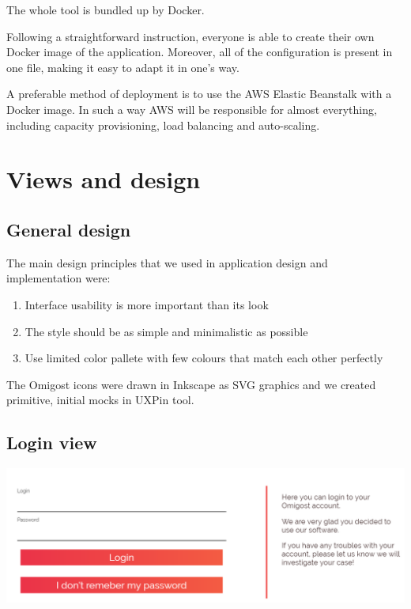 \documentclass[licencjacka,en]{thesisclass}
\begin{document}
    The whole tool is bundled up by Docker.

    Following a straightforward instruction, everyone is able
    to create their own Docker image of the application.
    Moreover, all of the configuration is present in one file,
    making it easy to adapt it in one's way.

    A preferable method of deployment is to use the AWS Elastic Beanstalk with a Docker image.
    In such a way AWS will be responsible for almost everything,
    including capacity provisioning, load balancing and auto-scaling.

    \section{Views and design}
    
    \subsection{General design}
    
    The main design principles that we used in application design and implementation were:
    \begin{enumerate}
        \item Interface usability is more important than its look
        \item The style should be as simple and minimalistic as possible
        \item Use limited color pallete with few colours that match each other perfectly        
    \end{enumerate}
    
    The Omigost icons were drawn in Inkscape as SVG graphics and we created primitive,
    initial mocks in UXPin \cite{UXPin} tool.
    
    \subsection{Login view}
    
    \includegraphics[width=\textwidth] {imgs/screenshots/screen_login.png}
  
\end{document}
